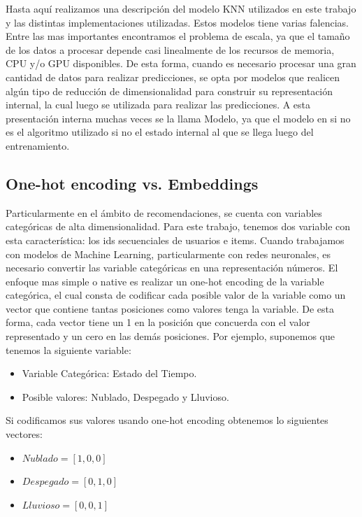 \documentclass[11pt,a4paper,twoside]{thesis}
\begin{document}
Hasta aquí realizamos una descripción del modelo KNN utilizados en este trabajo y las distintas implementaciones utilizadas. Estos modelos tiene varias falencias. Entre las mas importantes encontramos el problema de escala, ya que el tamaño de los datos a procesar depende casi linealmente de los recursos de memoria, CPU y/o GPU disponibles. De esta forma, cuando es necesario procesar una gran cantidad de datos para realizar predicciones, se opta por modelos que realicen algún tipo de reducción de dimensionalidad para construir su representación internal, la cual luego se utilizada para realizar las predicciones. A esta presentación interna muchas veces se la llama Modelo, ya que el modelo en si no es el algoritmo utilizado si no el estado internal al que se llega luego del entrenamiento. 

\subsection{One-hot encoding vs. Embeddings}

Particularmente en el ámbito de recomendaciones, se cuenta con variables categóricas de alta dimensionalidad. Para este trabajo, tenemos dos variable con esta característica: los ids secuenciales de usuarios e items. Cuando trabajamos con modelos de Machine Learning, particularmente con redes neuronales, es necesario convertir las variable categóricas en una representación números. El enfoque mas simple o native es realizar un one-hot encoding de la variable categórica, el cual consta de codificar cada posible valor de la variable como un vector que contiene tantas posiciones como valores tenga la variable. De esta forma, cada vector tiene un 1 en la posición que concuerda con el valor representado y un cero en las demás posiciones. Por ejemplo, suponemos que tenemos la siguiente variable:

\begin{itemize}
	\item Variable Categórica: Estado del Tiempo.
	\item Posible valores: Nublado, Despegado y Lluvioso.
\end{itemize}

Si codificamos sus valores usando one-hot encoding obtenemos lo siguientes vectores:

\begin{itemize}
	\item $Nublado    = [1, 0, 0]$
	\item $Despegado  = [0, 1, 0]$
	\item $Lluvioso   = [0, 0, 1]$
\end{itemize}
\end{document}
